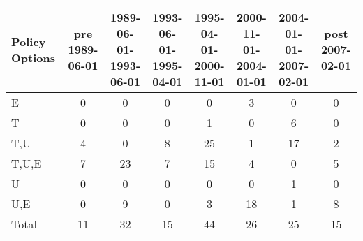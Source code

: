 \begin{tabular}{lccccccc}
\hline\hline 
\addlinespace 
Policy Options & pre 1989-06-01 & \shortstack{1989-06-01- \\ 1993-06-01} & \shortstack{1993-06-01- \\ 1995-04-01} & \shortstack{1995-04-01- \\ 2000-11-01} & \shortstack{2000-11-01- \\ 2004-01-01} & \shortstack{2004-01-01- \\ 2007-02-01} & post 2007-02-01 \\ 
\hline 
E & 0 & 0 & 0 & 0 & 3 & 0 & 0 \\
T & 0 & 0 & 0 & 1 & 0 & 6 & 0 \\
T,U & 4 & 0 & 8 & 25 & 1 & 17 & 2 \\
T,U,E & 7 & 23 & 7 & 15 & 4 & 0 & 5 \\
U & 0 & 0 & 0 & 0 & 0 & 1 & 0 \\
U,E & 0 & 9 & 0 & 3 & 18 & 1 & 8 \\
\addlinespace 
Total & 11 & 32 & 15 & 44 & 26 & 25 & 15 \\
\hline 
\end{tabular}